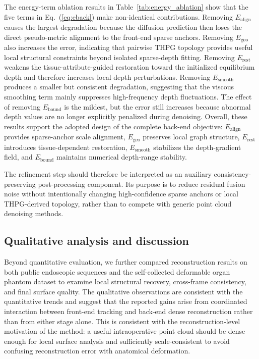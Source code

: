 \documentclass[pdflatex,sn-mathphys-num]{sn-jnl}
\begin{document}
The energy-term ablation results in Table~\ref{tab:energy_ablation} show that the five terms in Eq.~(\ref{eq:eback}) make non-identical contributions. Removing $E_{\mathrm{align}}$ causes the largest degradation because the diffusion prediction then loses the direct pseudo-metric alignment to the front-end sparse anchors. Removing $E_{\mathrm{geo}}$ also increases the error, indicating that pairwise THPG topology provides useful local structural constraints beyond isolated sparse-depth fitting. Removing $E_{\mathrm{rest}}$ weakens the tissue-attribute-guided restoration toward the initialized equilibrium depth and therefore increases local depth perturbations. Removing $E_{\mathrm{smooth}}$ produces a smaller but consistent degradation, suggesting that the viscous smoothing term mainly suppresses high-frequency depth fluctuations. The effect of removing $E_{\mathrm{bound}}$ is the mildest, but the error still increases because abnormal depth values are no longer explicitly penalized during denoising. Overall, these results support the adopted design of the complete back-end objective: $E_{\mathrm{align}}$ provides sparse-anchor scale alignment, $E_{\mathrm{geo}}$ preserves local graph structure, $E_{\mathrm{rest}}$ introduces tissue-dependent restoration, $E_{\mathrm{smooth}}$ stabilizes the depth-gradient field, and $E_{\mathrm{bound}}$ maintains numerical depth-range stability.

The refinement step should therefore be interpreted as an auxiliary consistency-preserving post-processing component. Its purpose is to reduce residual fusion noise without intentionally changing high-confidence sparse anchors or local THPG-derived topology, rather than to compete with generic point cloud denoising methods.

\subsection{Qualitative analysis and discussion}\label{subsec:discussion}

Beyond quantitative evaluation, we further compared reconstruction results on both public endoscopic sequences and the self-collected deformable organ phantom dataset to examine local structural recovery, cross-frame consistency, and final surface quality. The qualitative observations are consistent with the quantitative trends and suggest that the reported gains arise from coordinated interaction between front-end tracking and back-end dense reconstruction rather than from either stage alone. This is consistent with the reconstruction-level motivation of the method: a useful intraoperative point cloud should be dense enough for local surface analysis and sufficiently scale-consistent to avoid confusing reconstruction error with anatomical deformation.
\end{document}
